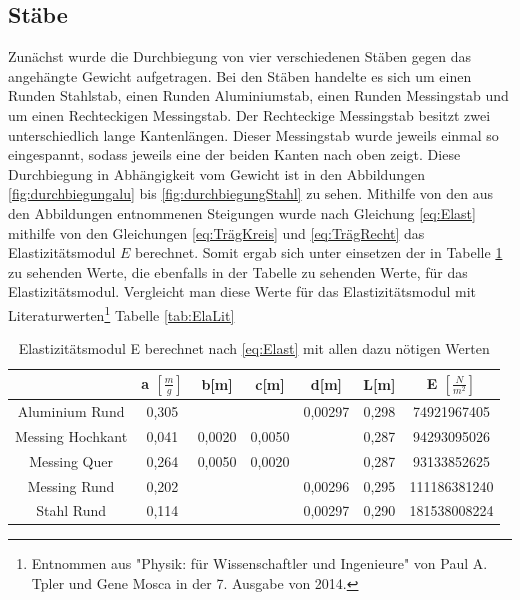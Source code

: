 \subsection{Stäbe}
Zunächst wurde die Durchbiegung von vier verschiedenen Stäben gegen das angehängte Gewicht aufgetragen.
Bei den Stäben handelte es sich um einen Runden Stahlstab, einen Runden Aluminiumstab, einen Runden Messingstab und um einen Rechteckigen Messingstab.
Der Rechteckige Messingstab besitzt zwei unterschiedlich lange Kantenlängen. Dieser Messingstab wurde jeweils einmal so eingespannt, sodass jeweils eine der beiden Kanten nach oben zeigt.
Diese Durchbiegung in Abhängigkeit vom Gewicht ist in den Abbildungen \ref{fig:durchbiegungalu} bis \ref{fig:durchbiegungStahl} zu sehen. 
Mithilfe von den aus den Abbildungen entnommenen Steigungen wurde nach Gleichung \ref{eq:Elast} mithilfe von den Gleichungen \ref{eq:TrägKreis} und \ref{eq:TrägRecht} das Elastizitätsmodul $E$ berechnet.
Somit ergab sich unter einsetzen der in Tabelle \ref{tab:Ela} zu sehenden Werte, die ebenfalls in der Tabelle zu sehenden Werte, für das Elastizitätsmodul. 
Vergleicht man diese Werte für das Elastizitätsmodul mit Literaturwerten\footnote{Entnommen aus "Physik: für Wissenschaftler und Ingenieure" von Paul A. Tpler und Gene Mosca in der 7. Ausgabe von 2014.} Tabelle \ref{tab:ElaLit}

\begin{table}[h]
	\caption{Elastizitätsmodul E berechnet nach \ref{eq:Elast} mit allen dazu nötigen Werten}
	\begin{tabular}{|c|c|c|c|c|c|c|}
		\hline
		& a $\left[ \frac{m}{g} \right]$& b[m]& c[m] & d[m] & L[m] & E $\left[\frac{N}{m^2}  \right]$ \\
		\hline
		Aluminium Rund & 0,305 & & & 0,00297 & 0,298 & 74921967405\\
		\hline
		Messing Hochkant & 0,041 & 0,0020 & 0,0050 && 0,287 & 94293095026\\
		\hline
		Messing Quer & 0,264 & 0,0050 & 0,0020 && 0,287 & 93133852625\\
		\hline
		Messing Rund & 0,202 &&& 0,00296 & 0,295 & 111186381240\\
		\hline
		Stahl Rund & 0,114 &&& 0,00297 & 0,290 & 181538008224\\
		\hline
	\end{tabular}
\label{tab:Ela}
\end{table}

